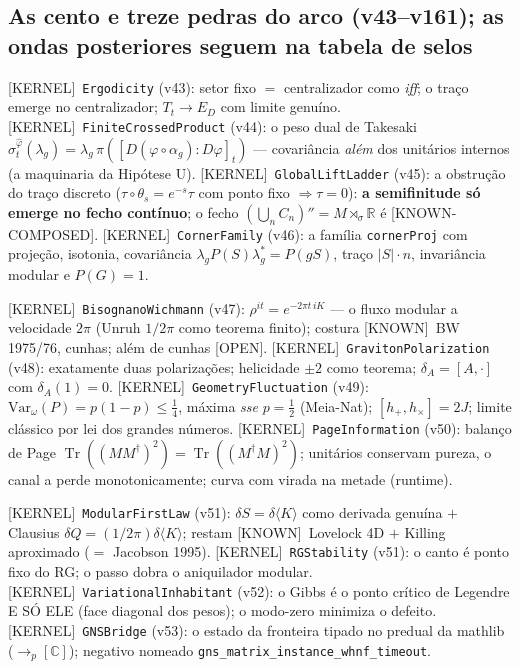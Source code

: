 \documentclass[11pt]{article}
\providecommand{\kernelmk}[1]{\textsf{[KERNEL]}~\texttt{#1}}\providecommand{\knownmk}[1]{\textsf{[KNOWN]}~{#1}}\providecommand{\statusmk}[1]{\textsf{[#1]}}
\theoremstyle{definition}\newtheorem{deriv}{Derivação}
\begin{document}
\subsection*{As cento e treze pedras do arco (v43--v161); as ondas posteriores seguem na tabela de selos}

\kernelmk{Ergodicity} (v43): setor fixo $=$ centralizador como \emph{iff}; o traço emerge no centralizador; $T_t\to E_D$ com limite genuíno. \kernelmk{FiniteCrossedProduct} (v44): o peso dual de Takesaki $\sigma^{\hat\varphi}_t(\lambda_g)=\lambda_g\,\pi([D(\varphi\circ\alpha_g):D\varphi]_t)$ --- covariância \emph{além} dos unitários internos (a maquinaria da Hipótese U). \kernelmk{GlobalLiftLadder} (v45): a obstrução do traço discreto ($\tau\circ\theta_s=e^{-s}\tau$ com ponto fixo $\Rightarrow\tau=0$): \textbf{a semifinitude só emerge no fecho contínuo}; o fecho $(\bigcup_n C_n)''=M\rtimes_\sigma\mathbb{R}$ é \statusmk{KNOWN-COMPOSED}. \kernelmk{CornerFamily} (v46): a família \texttt{cornerProj} com projeção, isotonia, covariância $\lambda_g P(S)\lambda_g^*=P(gS)$, traço $|S|\cdot n$, invariância modular e $P(G)=1$.

\kernelmk{BisognanoWichmann} (v47): $\rho^{it}=e^{-2\pi t\,iK}$ --- o fluxo modular a velocidade $2\pi$ (Unruh $1/2\pi$ como teorema finito); costura \knownmk{BW 1975/76, cunhas}; além de cunhas \statusmk{OPEN}. \kernelmk{GravitonPolarization} (v48): exatamente duas polarizações; helicidade $\pm2$ como teorema; $\delta_A=[A,\cdot]$ com $\delta_A(1)=0$. \kernelmk{GeometryFluctuation} (v49): $\mathrm{Var}_\omega(P)=p(1-p)\le\tfrac14$, máxima \emph{sse} $p=\tfrac12$ (Meia-Nat); $[h_+,h_\times]=2J$; limite clássico por lei dos grandes números. \kernelmk{PageInformation} (v50): balanço de Page $\operatorname{Tr}((MM^\dagger)^2)=\operatorname{Tr}((M^\dagger M)^2)$; unitários conservam pureza, o canal a perde monotonicamente; curva com virada na metade (runtime).

\kernelmk{ModularFirstLaw} (v51): $\delta S=\delta\langle K\rangle$ como derivada genuína $+$ Clausius $\delta Q=(1/2\pi)\delta\langle K\rangle$; restam \knownmk{Lovelock 4D} $+$ Killing aproximado ($=$ Jacobson 1995). \kernelmk{RGStability} (v51): o canto é ponto fixo do RG; o passo dobra o aniquilador modular. \kernelmk{VariationalInhabitant} (v52): o Gibbs é o ponto crítico de Legendre E SÓ ELE (face diagonal dos pesos); o modo-zero minimiza o defeito. \kernelmk{GNSBridge} (v53): o estado da fronteira tipado no predual da mathlib ($\to_{\!p}[\mathbb{C}]$); negativo nomeado \texttt{gns\_matrix\_instance\_whnf\_timeout}.
\end{document}
